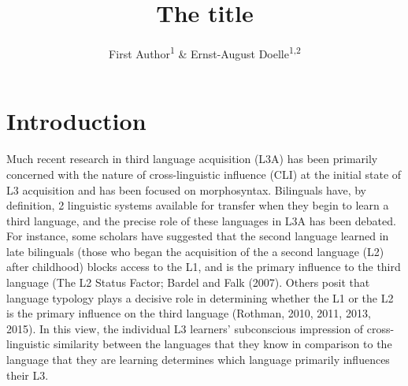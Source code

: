 \documentclass[
  english,
  man]{apa6}
\title{The title}
\author{First Author\textsuperscript{1} \& Ernst-August Doelle\textsuperscript{1,2}}
\date{}
\affiliation{\vspace{0.5cm}\textsuperscript{1} Wilhelm-Wundt-University\\\textsuperscript{2} Konstanz Business School}
\begin{document}
\maketitle

\hypertarget{introduction}{%
\section{Introduction}\label{introduction}}

Much recent research in third language acquisition (L3A) has been primarily concerned with the nature of cross-linguistic influence (CLI) at the initial state of L3 acquisition and has been focused on morphosyntax.
Bilinguals have, by definition, 2 linguistic systems available for transfer when they begin to learn a third language, and the precise role of these languages in L3A has been debated.
For instance, some scholars have suggested that the second language learned in late bilinguals (those who began the acquisition of the a second language (L2) after childhood) blocks access to the L1, and is the primary influence to the third language (The L2 Status Factor; Bardel and Falk (2007).
Others posit that language typology plays a decisive role in determining whether the L1 or the L2 is the primary influence on the third language (Rothman, 2010, 2011, 2013, 2015).
In this view, the individual L3 learners' subconscious impression of cross-linguistic similarity between the languages that they know in comparison to the language that they are learning determines which language primarily influences their L3.
\end{document}
